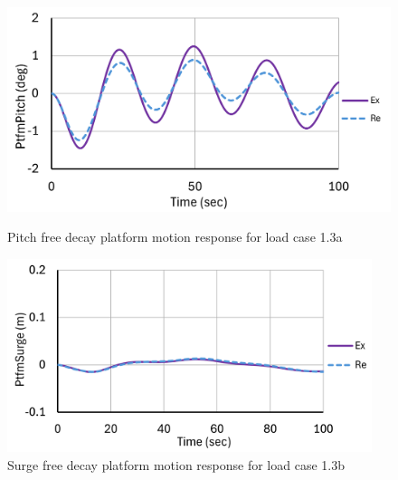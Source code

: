 \documentclass[a4paper, 11pt]{article}
\begin{document}
\begin{figure}[H]
    \begin{minipage}{0.47\textwidth}
        \centering
        \includegraphics[width=1\textwidth]{1.3a_pitch_mine_1.png}
        \caption{\small Pitch free decay platform motion response for load case 1.3a}
        \label{fig:1.3a_pitch_mine_recreated}
    \end{minipage}
    \hfill
    \begin{minipage}{0.49\textwidth}
        \centering
        \includegraphics[width=0.95\textwidth]{1.3b_surge_mine_1.png}
        \caption{\small Surge free decay platform motion response for load case 1.3b}
        \label{fig:1.3b_surge_mine_recreated}
    \end{minipage}
\end{figure}
\end{document}
